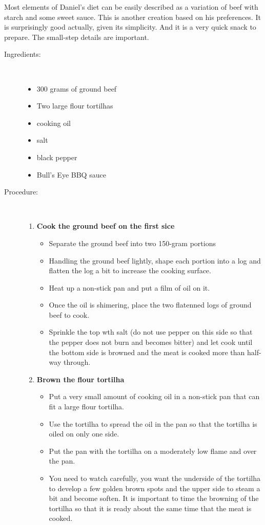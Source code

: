 \documentclass[11pt,letterpaper]{article}
\begin{document}


Most elements of Daniel's diet can be easily described as a variation of beef with starch and some sweet sauce. This is another creation based on his preferences. It is surprisingly good actually, given its simplicity. And it is a very quick snack to prepare. The small-step details are important.

 
\begin {description}

\item[Ingredients:]\ \\
\begin{itemize}
	\item 300 grams of ground beef
	\item Two large flour tortilhas
	\item cooking oil
	\item salt
	\item black pepper
	\item Bull's Eye BBQ sauce
\end{itemize}

\item[Procedure:]\ \\

\begin{enumerate}
\item {\bf Cook the ground beef on the first sice}
\begin{itemize}
\item Separate the ground beef into two 150-gram portions
\item Handling the ground beef lightly, shape each portion into a log and flatten the log a bit to increase the cooking surface.
\item Heat up a non-stick pan and put a film of oil on it.
\item Once the oil is shimering, place the two flatenned logs of ground beef to cook.
\item Sprinkle the top wth salt (do not use pepper on this side so that the pepper does not burn and becomes bitter) and let cook until the bottom side is browned and the meat is cooked more than half-way through.
\end{itemize}


\item {\bf Brown the flour tortilha}
\begin{itemize}
\item Put a very small amount of cooking oil in a non-stick pan that can fit a large flour tortilha.
\item Use the tortilha to spread the oil in the pan so that the tortilha is oiled on only one side.
\item Put the pan with the tortilha on a moderately low flame and over the pan.
\item You need to watch carefully, you want the underside of the tortilha to develop a few golden brown spots and the upper side to steam a bit and become soften. It is important to time the browning of the tortilha so that it is ready about the same time that the meat is cooked.
\end{itemize}


\end{enumerate}
\end{description}
\end{document}
